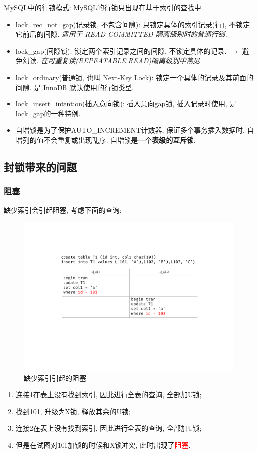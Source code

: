 MySQL中的行锁模式: MySQL的行锁只出现在基于索引的查找中.
\begin{itemize}
  \item lock\_rec\_not\_gap(记录锁, 不包含间隙): 只锁定具体的索引记录(行), 不锁定它前后的间隙. \textit{适用于 READ COMMITTED 隔离级别时的普通行锁.}
  \item lock\_gap(间隙锁): 锁定两个索引记录之间的间隙, 不锁定具体的记录. $\to$ 避免幻读. \textit{在可重复读(REPEATABLE READ)隔离级别中常见.}
  \item lock\_ordinary(普通锁, 也叫 Next-Key Lock): 锁定一个具体的记录及其前面的间隙, 是 InnoDB 默认使用的行锁类型.
  \item lock\_insert\_intention(插入意向锁): 插入意向gap锁, 插入记录时使用, 是lock\_gap的一种特例.
  \item 自增锁是为了保护AUTO\_INCREMENT计数器, 保证多个事务插入数据时, 自增列的值不会重复或出现乱序. 自增锁是一个\textbf{表级的互斥锁}.
\end{itemize}

\subsection{封锁带来的问题}

\subsubsection{阻塞}

缺少索引会引起阻塞, 考虑下面的查询:
\begin{figure}[H]
    \centering
    \includegraphics[width=.7\textwidth]{figure/阻塞.pdf}
    \caption{缺少索引引起的阻塞}
\end{figure}

\begin{enumerate}
    \item 连接1在表上没有找到索引, 因此进行全表的查询, 全部加U锁;
    \item 找到101, 升级为X锁, 释放其余的U锁;
    \item 连接2在表上没有找到索引, 因此进行全表的查询, 全部加U锁;
    \item 但是在试图对101加锁的时候和X锁冲突, 此时出现了\textcolor{red}{阻塞}.
\end{enumerate}

